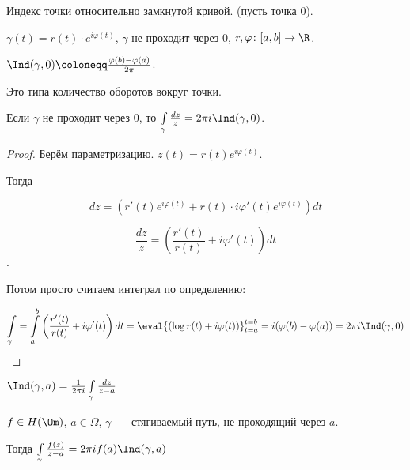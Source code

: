 \begin{definition}
    Индекс точки относительно замкнутой кривой.
    (пусть точка $0$).

    $\gamma(t) = r(t)\cdot e^{i\varphi(t)}$,
    $\gamma$ не проходит через $0$,
    $r, \varphi \colon [a, b] \to \R$.

    $\Ind(\gamma, 0) \coloneqq \frac{\varphi(b) - \varphi(a)}{2\pi}$.

    Это типа количество оборотов вокруг точки.
\end{definition}

\begin{theorem}
    Если $\gamma$ не проходит через $0$, то
    $\int\limits_\gamma \frac{dz}{z} = 2\pi i \Ind(\gamma, 0)$.
\end{theorem}

\begin{proof}
    Берём параметризацию.
    $z(t) = r(t)e^{i\varphi(t)}$.

    Тогда

    \[
        dz = \left(r'(t)e^{i\varphi(t)}
        + r(t)\cdot i \varphi'(t) e^{i\varphi(t)}\right) dt
    \]

    \[\frac{dz}z = \left(
        \frac{r'(t)}{r(t)} + i\varphi'(t)
        \right) dt\].

    Потом просто считаем интеграл по определению:

    \[
        \int\limits_\gamma =
        \int\limits_a^b \left(\frac{r'(t)}{r(t)}
        + i \varphi'(t)\right) dt =
        \eval{\left(\log r(t) + i\varphi(t)\right)}_{t=a}^{t=b} =
        i(\varphi(b) - \varphi(a))
        = 2\pi i \Ind(\gamma, 0)
    \]
\end{proof}

\begin{consequence}
    $\Ind(\gamma, a) = \frac{1}{2 \pi i} \int\limits_\gamma \frac{dz}{z - a}$
\end{consequence}

\begin{theorem}
    $f \in H(\Om)$, $a \in \Omega$,
    $\gamma$~--- стягиваемый путь, не проходящий через $a$.

    Тогда $\int\limits_\gamma \frac{f(z)}{z - a} =
        2\pi i f(a) \Ind(\gamma, a)$
\end{theorem}

